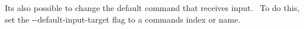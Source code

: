 \begin{DoxyCode}{0}

\end{DoxyCode}


It\textquotesingle{}s also possible to change the default command that receives input.~\newline
 To do this, set the {\ttfamily -\/-\/default-\/input-\/target} flag to a command\textquotesingle{}s index or name.


\begin{DoxyCode}{0}

\end{DoxyCode}
 